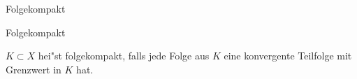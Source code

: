 \documentclass[class=article, crop=false]{standalone}
\begin{document}
\begin{zettel}{Folgekompakt}
\begin{flashcard}[fnkwlze3]{Folgekompakt}
	\begin{definition}[folgekompakt]
		$K \subset  X$ hei"st folgekompakt, falls jede Folge aus $K$ eine konvergente Teilfolge mit Grenzwert in $K$ hat.
	\end{definition}
\end{flashcard}
\end{zettel}
\end{document}
